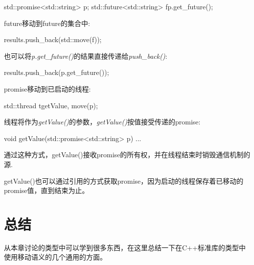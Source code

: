 \begin{codebox}[cpp]
std::promise<std::string> p;
std::future<std::string> f{p.get_future()};
\end{codebox}

future移动到future的集合中:\par

\begin{codebox}[cpp]
results.push_back(std::move(f));
\end{codebox}

也可以将\textit{p.get\_\allowbreak{}future(\allowbreak{})\allowbreak{}}的结果直接传递给\textit{push\_\allowbreak{}back(\allowbreak{})\allowbreak{}}:\par

\begin{codebox}[cpp]
results.push_back(p.get_future());
\end{codebox}

promise移动到已启动的线程:\par

\begin{codebox}[cpp]
std::thread t{getValue, move(p)};
\end{codebox}

线程将作为\textit{getValue()}的参数，\textit{getValue()}按值接受传递的promise:\par

\begin{codebox}[cpp]
void getValue(std::promise<std::string> p)
{
  ...
}
\end{codebox}

通过这种方式，getValue()接收promise的所有权，并在线程结束时销毁通信机制的源.\par

getValue()也可以通过引用的方式获取promise，因为启动的线程保存着已移动的promise值，直到结束为止。\par


\section{总结}

从本章讨论的类型中可以学到很多东西，在这里总结一下在C++标准库的类型中使用移动语义的几个通用的方面。\par

